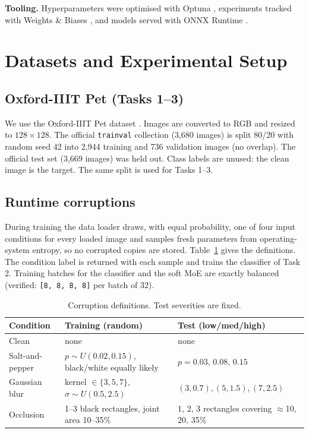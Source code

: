 \documentclass[conference]{IEEEtran}
\begin{document}
\textbf{Tooling.} Hyperparameters were optimised with Optuna \cite{akiba2019}, experiments tracked with Weights \& Biases \cite{biewald2020}, and models served with ONNX Runtime \cite{onnxrt}.

\section{Datasets and Experimental Setup}
\subsection{Oxford-IIIT Pet (Tasks 1--3)}
We use the Oxford-IIIT Pet dataset \cite{parkhi2012}. Images are converted to RGB and resized to $128\times128$. The official \texttt{trainval} collection (3{,}680 images) is split 80/20 with random seed 42 into 2{,}944 training and 736 validation images (no overlap). The official test set (3{,}669 images) was held out. Class labels are unused: the clean image is the target. The same split is used for Tasks 1--3.

\subsection{Runtime corruptions}
During training the data loader draws, with equal probability, one of four input conditions for every loaded image and samples fresh parameters from operating-system entropy, so no corrupted copies are stored. Table~\ref{tab:corr} gives the definitions. The condition label is returned with each sample and trains the classifier of Task 2. Training batches for the classifier and the soft MoE are exactly balanced (verified: \texttt{[8, 8, 8, 8]} per batch of 32).

\begin{table}[t]
\centering
\caption{Corruption definitions. Test severities are fixed.}\label{tab:corr}
\footnotesize\setlength{\tabcolsep}{3pt}
\begin{tabular}{@{}p{1.6cm}p{2.7cm}p{2.5cm}@{}}
\toprule
Condition & Training (random) & Test (low/med/high)\\
\midrule
Clean & none & none\\
Salt-and-pepper & $p\sim U(0.02,0.15)$, black/white equally likely & $p=0.03,\,0.08,\,0.15$\\
Gaussian blur & kernel $\in\{3,5,7\}$, $\sigma\sim U(0.5,2.5)$ & $(3,0.7),(5,1.5),(7,2.5)$\\
Occlusion & 1--3 black rectangles, joint area 10--35\% & 1, 2, 3 rectangles covering $\approx$10, 20, 35\%\\
\bottomrule
\end{tabular}
\end{table}
\end{document}
